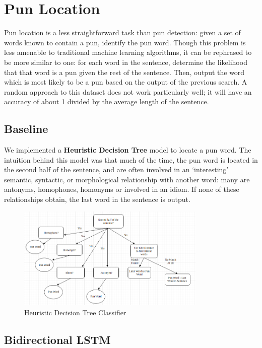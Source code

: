 \documentclass{article}
\begin{document}
\section{Pun Location}
\label{pun_location}

Pun location is a less straightforward task than pun detection: given a set of
words known to contain a pun, identify the pun word. Though this problem is less
amenable to traditional machine learning algorithms, it can be rephrased to be
more similar to one: for each word in the sentence, determine the likelihood
that that word is a pun given the rest of the sentence. Then, output the word
which is most likely to be a pun based on the output of the previous search.  A
random approach to this dataset does not work particularly well; it will have an
accuracy of about 1 divided by the average length of the sentence.
 
\subsection{Baseline}

We implemented a \textbf{Heuristic Decision Tree} model to locate a pun word.
The intuition behind this model was that much of the time, the pun word is
located in the second half of the sentence, and are often involved in an
`interesting' semantic, syntactic, or morphological relationship with another
word: many are antonyms, homophones, homonyms or involved in an idiom. If none
of these relationships obtain, the last word in the sentence is output.

\begin{figure}[h!]
\centering
\includegraphics[width=90mm]{figures/decision_tree.png}
\caption{Heuristic Decision Tree Classifier}
\label{fig:method}
\end{figure}

\subsection{Bidirectional LSTM}
\end{document}
